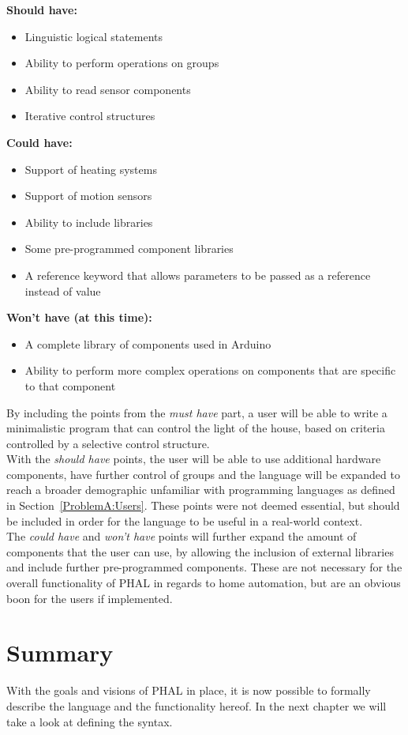 \noindent\textbf{Should have:}
\begin{itemize}
    \item Linguistic logical statements
    \item Ability to perform operations on groups
    \item Ability to read sensor components
    \item Iterative control structures
\end{itemize}

\noindent\textbf{Could have:}
\begin{itemize}
    \item Support of heating systems
    \item Support of motion sensors
    \item Ability to include libraries
    \item Some pre-programmed component libraries
    \item A reference keyword that allows parameters to be passed as a reference instead of value 
\end{itemize}

\noindent\textbf{Won't have (at this time):}
\begin{itemize}
    \item A complete library of components used in Arduino
    \item Ability to perform more complex operations on components that are specific to that component
\end{itemize}
\noindent
By including the points from the \textit{must have} part, a user will be able to write a minimalistic program that can control the light of the house, based on criteria controlled by a selective control structure.\\
With the \textit{should have} points, the user will be able to use additional hardware components, have further control of groups and the language will be expanded to reach a broader demographic unfamiliar with programming languages as defined in Section~\ref{ProblemA:Users}. These points were not deemed essential, but should be included in order for the language to be useful in a real-world context.\\
The \textit{could have} and \textit{won't have} points will further expand the amount of components that the user can use, by allowing the inclusion of external libraries and include further pre-programmed components. These are not necessary for the overall functionality of PHAL in regards to home automation, but are an obvious boon for the users if implemented.

\section{Summary}
With the goals and visions of PHAL in place, it is now possible to formally describe the language and the functionality hereof.
In the next chapter we will take a look at defining the syntax.